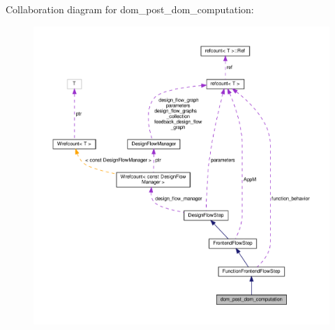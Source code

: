 Collaboration diagram for dom\+\_\+post\+\_\+dom\+\_\+computation\+:
\nopagebreak
\begin{figure}[H]
\begin{center}
\leavevmode
\includegraphics[width=350pt]{df/da4/classdom__post__dom__computation__coll__graph}
\end{center}
\end{figure}
